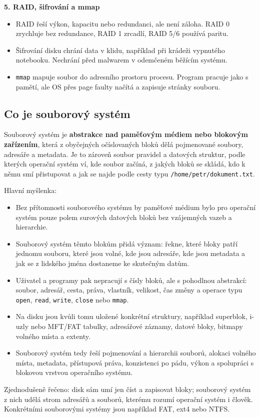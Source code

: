 \textbf{5. RAID, šifrování a mmap}
\begin{itemize}
  \item RAID řeší výkon, kapacitu nebo redundanci, ale není záloha. RAID 0 zrychluje bez redundance, RAID 1 zrcadlí, RAID 5/6 používá paritu.
  \item Šifrování disku chrání data v klidu, například při krádeži vypnutého notebooku. Nechrání před malwarem v odemčeném běžícím systému.
  \item \texttt{mmap} mapuje soubor do adresního prostoru procesu. Program pracuje jako s pamětí, ale OS přes page faulty načítá a zapisuje stránky souboru.
\end{itemize}

\subsection*{Co je souborový systém}
Souborový systém je \textbf{abstrakce nad paměťovým médiem nebo blokovým zařízením}, která z obyčejných očíslovaných bloků dělá pojmenované soubory, adresáře a metadata. Je to zároveň soubor pravidel a datových struktur, podle kterých operační systém ví, kde soubor začíná, z jakých bloků se skládá, kdo k němu smí přistupovat a jak se najde podle cesty typu \texttt{/home/petr/dokument.txt}.

Hlavní myšlenka:
\begin{itemize}
  \item Bez přítomnosti souborového systému by paměťové médium bylo pro operační systém pouze polem surových datových bloků bez vzájemných vazeb a hierarchie.
  \item Souborový systém těmto blokům přidá význam: řekne, které bloky patří jednomu souboru, které jsou volné, kde jsou adresáře, kde jsou metadata a jak se z lidského jména dostaneme ke skutečným datům.
  \item Uživatel a programy pak nepracují s čísly bloků, ale s pohodlnou abstrakcí: soubor, adresář, cesta, práva, vlastník, velikost, čas změny a operace typu \texttt{open}, \texttt{read}, \texttt{write}, \texttt{close} nebo \texttt{mmap}.
  \item Na disku jsou kvůli tomu uložené konkrétní struktury, například superblok, i-uzly nebo MFT/FAT tabulky, adresářové záznamy, datové bloky, bitmapy volného místa a extenty.
  \item Souborový systém tedy řeší pojmenování a hierarchii souborů, alokaci volného místa, metadata, přístupová práva, konzistenci po pádu, výkon a spolupráci s blokovou vrstvou operačního systému.
\end{itemize}
Zjednodušeně řečeno: disk sám umí jen číst a zapisovat bloky; souborový systém z nich udělá strom adresářů a souborů, kterému rozumí operační systém i člověk. Konkrétními souborovými systémy jsou například FAT, ext4 nebo NTFS.

